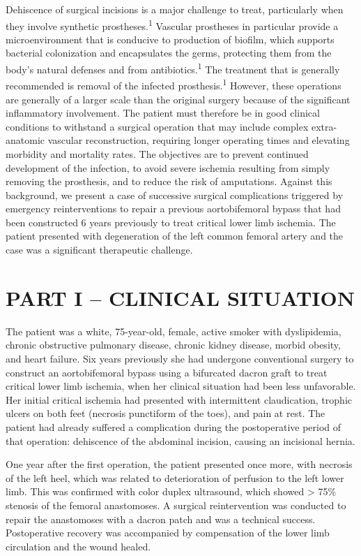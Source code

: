 \documentclass[numberinsection,times,10pt,spreadimages]{memoir}
\begin{document}
Dehiscence of surgical incisions is a major challenge to treat, particularly
when
they involve synthetic prostheses.\textsuperscript{1}
Vascular prostheses in particular provide a
microenvironment that is conducive to production of biofilm, which supports
bacterial colonization and encapsulates the germs, protecting them from the
body’s natural defenses and from antibiotics.\textsuperscript{1}
The treatment that is generally recommended is
removal of the infected prosthesis.\textsuperscript{1}
However, these operations are generally of a larger
scale than the original surgery because of the significant inflammatory
involvement. The patient must therefore be in good clinical conditions to
withstand a surgical operation that may include complex extra-anatomic vascular
reconstruction, requiring longer operating times and elevating morbidity and
mortality rates. The objectives are to prevent continued development of the
infection, to avoid severe ischemia resulting from simply removing the
prosthesis, and to reduce the risk of amputations. Against this background, we
present a case of successive surgical complications triggered by emergency
reinterventions to repair a previous aortobifemoral bypass that had been
constructed 6 years previously to treat critical lower limb ischemia. The
patient presented with degeneration of the left common femoral artery and the
case was a significant therapeutic challenge.

\section{PART I – CLINICAL SITUATION}

The patient was a white, 75-year-old, female, active smoker with dyslipidemia,
chronic obstructive pulmonary disease, chronic kidney disease, morbid obesity,
and heart failure. Six years previously she had undergone conventional surgery
to construct an aortobifemoral bypass using a bifurcated dacron graft to treat
critical lower limb ischemia, when her clinical situation had been less
unfavorable. Her initial critical ischemia had presented with intermittent
claudication, trophic ulcers on both feet (necrosis punctiform of the toes), and
pain at rest. The patient had already suffered a complication during the
postoperative period of that operation: dehiscence of the abdominal incision,
causing an incisional hernia.

One year after the first operation, the patient presented once more, with
necrosis of the left heel, which was related to deterioration of perfusion to
the left lower limb. This was confirmed with color duplex ultrasound, which
showed > 75\% stenosis of the femoral anastomoses. A surgical reintervention
was conducted to repair the anastomoses with a dacron patch and was a technical
success. Postoperative recovery was accompanied by compensation of the lower
limb circulation and the wound healed.
\end{document}
